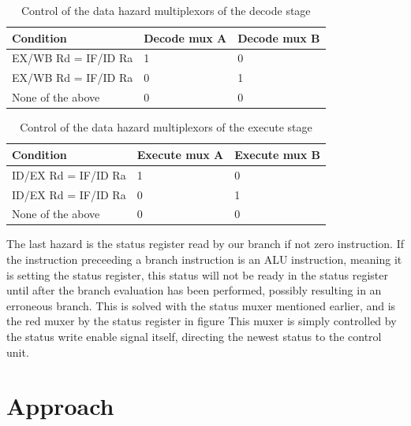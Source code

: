 \documentclass[11pt]{report}
\begin{document}
\begin{table}[htbp]
  \centering
  \begin{tabular}{|l|l|l|}
    \hline
    Condition&Decode mux A&Decode mux B \\
    \hline
    EX/WB Rd = IF/ID Ra	&1	& 0\\
    EX/WB Rd = IF/ID Ra	&0	& 1\\
    None of the above	&0	& 0\\
    \hline
    
  \end{tabular}
  \caption{Control of the data hazard multiplexors of the decode stage}
  \label{tab:demuxes}
\end{table}

\begin{table}[htbp]
  \centering
  \begin{tabular}{|l|l|l|}
    \hline
    Condition&Execute mux A&Execute mux B \\
    \hline
    ID/EX Rd = IF/ID Ra	&1	& 0\\
    ID/EX Rd = IF/ID Ra	&0	& 1\\
    None of the above	&0	& 0\\
    \hline
    
  \end{tabular}
  \caption{Control of the data hazard multiplexors of the execute stage}
  \label{tab:exmuxes}
\end{table}
The last hazard is the status register read by our branch if not zero instruction.
If the instruction preceeding a branch instruction is an ALU instruction, meaning it
is setting the status register, this status will not be ready in the status register
until after the branch evaluation has been performed, possibly resulting in an
erroneous branch. This is solved with the status muxer mentioned earlier, and is the 
red muxer by the status register in figure %
This muxer is simply controlled by the status write enable signal itself, directing the
newest status to the control unit.


\section*{Approach}

\end{document}
